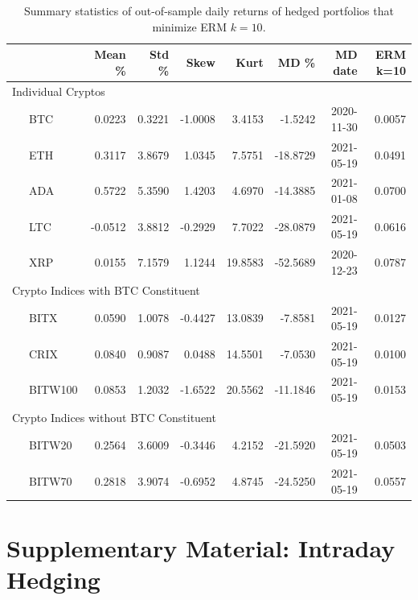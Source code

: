 \documentclass[11pt,a4paper,english]{article}
\begin{document}
{\begin{table}[!]
\end{table}\begin{table}[!] \centering %
  {%
\begin{tabular}{lrrrrrrr} \toprule
         {} &    Mean \% &     Std \% &      Skew &       Kurt &         MD \% &     MD date & ERM k=10 \\
\midrule
     \multicolumn{7}{l}{Individual Cryptos}                                                                                 \\
\ \ \ BTC     &  0.0223 &  0.3221 & -1.0008 &   3.4153 &  -1.5242 &  2020-11-30 &    0.0057 \\
\ \ \ ETH     &  0.3117 &  3.8679 &  1.0345 &   7.5751 & -18.8729 &  2021-05-19 &    0.0491 \\
\ \ \ ADA     &  0.5722 &  5.3590 &  1.4203 &   4.6970 & -14.3885 &  2021-01-08 &    0.0700 \\
\ \ \ LTC     & -0.0512 &  3.8812 & -0.2929 &   7.7022 & -28.0879 &  2021-05-19 &    0.0616 \\
\ \ \ XRP     &  0.0155 &  7.1579 &  1.1244 &  19.8583 & -52.5689 &  2020-12-23 &    0.0787 \\
   \multicolumn{7}{l}{Crypto Indices with BTC Constituent}                                                                  \\
\ \ \ BITX    &  0.0590 &  1.0078 & -0.4427 &  13.0839 &  -7.8581 &  2021-05-19 &    0.0127 \\
\ \ \ CRIX    &  0.0840 &  0.9087 &  0.0488 &  14.5501 &  -7.0530 &  2021-05-19 &    0.0100 \\
\ \ \ BITW100 &  0.0853 &  1.2032 & -1.6522 &  20.5562 & -11.1846 &  2021-05-19 &    0.0153 \\
    \multicolumn{7}{l}{Crypto Indices without BTC Constituent}                                                              \\
\ \ \ BITW20  &  0.2564 &  3.6009 & -0.3446 &   4.2152 & -21.5920 &  2021-05-19 &    0.0503 \\
\ \ \ BITW70  &  0.2818 &  3.9074 & -0.6952 &   4.8745 & -24.5250 &  2021-05-19 &    0.0557 \\
\bottomrule
\end{tabular}}
\caption{Summary statistics of out-of-sample daily returns of hedged portfolios that minimize ERM $k=10$.}
\label{tab:ERM_rh}

\end{table}
}

\clearpage
\section{Supplementary Material: Intraday Hedging}\label{sec:intraday}
\end{document}
